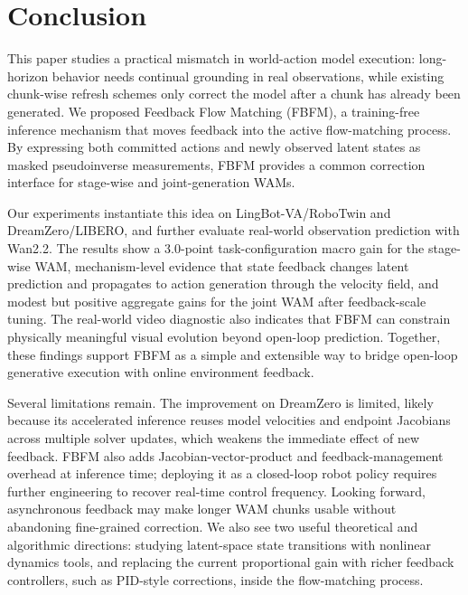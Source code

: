 
\section{Conclusion}
\label{sec:conclusion}

This paper studies a practical mismatch in world-action model execution:
long-horizon behavior needs continual grounding in real observations, while
existing chunk-wise refresh schemes only correct the model after a chunk has
already been generated. We proposed Feedback Flow Matching (FBFM), a
training-free inference mechanism that moves feedback into the active
flow-matching process. By expressing both committed actions and newly observed
latent states as masked pseudoinverse measurements, FBFM provides a common
correction interface for stage-wise and joint-generation WAMs.

Our experiments instantiate this idea on LingBot-VA/RoboTwin and
DreamZero/LIBERO, and further evaluate real-world observation prediction with
Wan2.2. The results show a 3.0-point task-configuration macro gain for the
stage-wise WAM, mechanism-level evidence that state feedback changes latent
prediction and propagates to action generation through the velocity field, and
modest but positive aggregate gains for the joint WAM after feedback-scale
tuning. The real-world video diagnostic
also indicates that FBFM can constrain physically meaningful visual evolution
beyond open-loop prediction. Together, these findings support FBFM as a simple
and extensible way to bridge open-loop generative execution with online
environment feedback.

Several limitations remain. The improvement on DreamZero is limited, likely
because its accelerated inference reuses model velocities and endpoint
Jacobians across multiple solver updates, which weakens the immediate effect of
new feedback. FBFM also adds Jacobian-vector-product and feedback-management
overhead at inference time; deploying it as a closed-loop robot policy requires
further engineering to recover real-time control frequency. Looking forward,
asynchronous feedback may make longer WAM chunks usable without abandoning
fine-grained correction. We also see two useful theoretical and algorithmic
directions: studying latent-space state transitions with nonlinear dynamics
tools, and replacing the current proportional gain with richer feedback
controllers, such as PID-style corrections, inside the flow-matching process.

